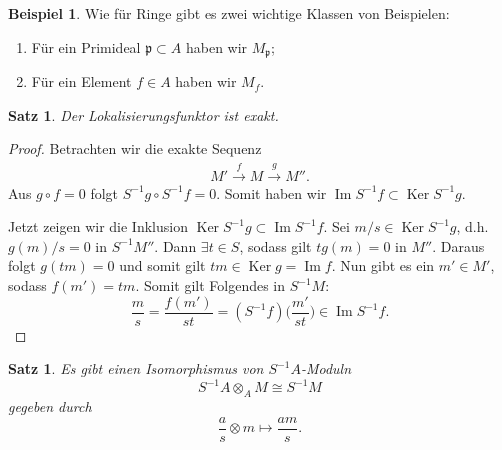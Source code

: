 \documentclass[reqno,12pt]{article}
\numberwithin{equation}{section}
\newcommand{\Ker}{\text{Ker }}
\renewcommand{\Im}{\text{Im }}
\theoremstyle{plain}
\newtheorem{proposition}[thm]{Satz}
\theoremstyle{definition}
\newtheorem{example}[thm]{Beispiel}
\renewcommand{\Ker}{\operatorname{Ker}}
\renewcommand{\Im}{\operatorname{Im}}
\begin{document}
\begin{example}
Wie für Ringe gibt es zwei wichtige Klassen von Beispielen:
\begin{enumerate}
\item Für ein Primideal $\mathfrak{p} \subset A$ haben wir $M_{\mathfrak{p}}$;

\item Für ein Element $f \in A$ haben wir $M_f$.
\end{enumerate}
\end{example}


\begin{proposition}\label{satz-localization-is-exact}
Der Lokalisierungsfunktor ist exakt.
\end{proposition}

\begin{proof}
Betrachten wir die exakte Sequenz
\begin{align*}
M' \overset{f}{\to}  M \overset{g}{\to} M''.
\end{align*}
Aus $g \circ f = 0$ folgt $S^{-1} g \circ S^{-1} f = 0$. Somit haben wir $\Im S^{-1} f \subset \Ker S^{-1} g$.

Jetzt zeigen wir die Inklusion $\Ker S^{-1} g \subset \Im S^{-1} f$. Sei $m/s \in \Ker S^{-1} g$, d.h. $g(m)/s = 0$ in $S^{-1} M''$. Dann $\exists t \in S$, sodass gilt $t g(m)=0$ in $M''$. Daraus folgt $g(tm)=0$ und somit gilt $tm \in \Ker g = \Im f$. Nun gibt es ein $m' \in M'$, sodass $f(m')=tm$. Somit gilt Folgendes in $S^{-1} M$:
$$
\frac{m}{s} = \frac{f(m')}{st} = (S^{-1} f)\Big(\frac{m'}{st}\Big) \in \Im S^{-1} f.
$$
\end{proof}

\begin{proposition}\label{satz-localization-as-extension-of-scalars}
Es gibt einen Isomorphismus von $S^{-1} A$-Moduln
$$
S^{-1} A \otimes_A M \cong S^{-1} M
$$
gegeben durch
$$
\frac{a}{s} \otimes m \mapsto \frac{am}{s}.
$$
\end{proposition}
\end{document}
